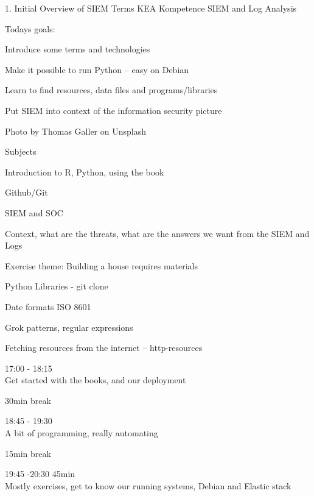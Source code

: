 \documentclass[Screen16to9,17pt]{foils}
\begin{document}
\mytitlepage
{1. Initial Overview of SIEM Terms}
{KEA Kompetence SIEM and Log Analysis}




Todays goals:
\begin{list2}
\item Introduce some terms and technologies
\item Make it possible to run Python -- easy on Debian
\item Learn to find resources, data files and programs/libraries
\item Put SIEM into context of the information security picture
\end{list2}

  Photo by Thomas Galler on Unsplash



\begin{list1}
\item Subjects
\begin{list2}
\item Introduction to R, Python, using the book
\item Github/Git
\item SIEM and SOC
\item Context, what are the threats, what are the answers we want from the SIEM and Logs
\end{list2}
\item Exercise theme: Building a house requires materials
\begin{list2}
\item Python Libraries - git clone
\item Date formats ISO 8601
\item Grok patterns, regular expressions
\item Fetching resources from the internet -- http-resources
\end{list2}
\end{list1}



\begin{list2}
\item 17:00 - 18:15\\
Get started with the books, and our deployment

\item 30min break\\

\item 18:45 - 19:30\\
A bit of programming, really automating

\item 15min break\\

\item 19:45 -20:30 45min\\
Mostly exercises, get to know our running systems, Debian and Elastic stack

\end{list2}
\end{document}
